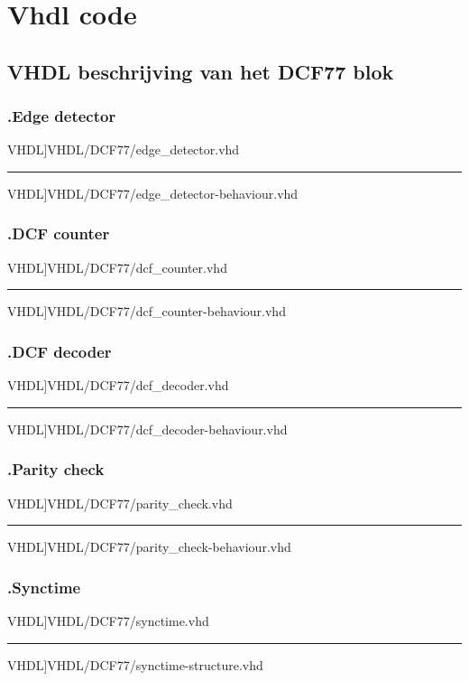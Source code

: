 \chapter[VHDL code]{Vhdl code}
\section{VHDL beschrijving van het DCF77 blok}
\label{Ap: DCF_code}
\subsection*{\label{code: edge_detector}\thesubsection.\quad Edge detector}
\scriptsize 
 VHDL]{VHDL/DCF77/edge_detector.vhd}
\hrule
 VHDL]{VHDL/DCF77/edge_detector-behaviour.vhd}
\normalsize
\newpage

\subsection*{\label{code: dcf_counter}\thesubsection.\quad DCF counter}
\scriptsize 
 VHDL]{VHDL/DCF77/dcf_counter.vhd}
\hrule
 VHDL]{VHDL/DCF77/dcf_counter-behaviour.vhd}
\normalsize

\subsection*{\label{code: dcf_decoder}\thesubsection.\quad DCF decoder}
\scriptsize 
 VHDL]{VHDL/DCF77/dcf_decoder.vhd}
\hrule
 VHDL]{VHDL/DCF77/dcf_decoder-behaviour.vhd}
\normalsize

\subsection*{\label{code: parity_check}\thesubsection.\quad Parity check}
\scriptsize 
 VHDL]{VHDL/DCF77/parity_check.vhd}
\hrule
 VHDL]{VHDL/DCF77/parity_check-behaviour.vhd}
\normalsize

\subsection*{\label{code: synctime}\thesubsection.\quad Synctime}
\scriptsize 
 VHDL]{VHDL/DCF77/synctime.vhd}
\hrule
 VHDL]{VHDL/DCF77/synctime-structure.vhd}
\normalsize


